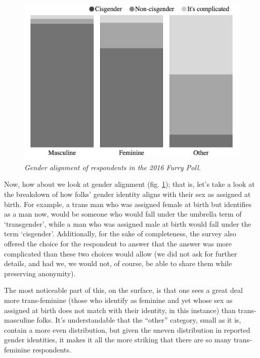 \begin{figure}
  \centering
  \includegraphics[scale=0.45]{assets/alignment.png}
  \caption{\textit{Gender alignment of respondents in the 2016 Furry Poll.}}
  \label{fig:alignment}
\end{figure}

Now, how about we look at gender alignment (fig. \ref{fig:alignment}); that is, let's take a look at the breakdown of how folks' gender identity aligns with their sex as assigned at birth.  For example, a trans man who was assigned female at birth but identifies as a man now, would be someone who would fall under the umbrella term of `transgender', while a man who was assigned male at birth would fall under the term `cisgender'.  Additionally, for the sake of completeness, the survey also offered the choice for the respondent to answer that the answer was more complicated than these two choices would allow (we did not ask for further details, and had we, we would not, of course, be able to share them while preserving anonymity).

The most noticeable part of this, on the surface, is that one sees a great deal more trans-feminine (those who identify as feminine and yet whose sex as assigned at birth does not match with their identity, in this instance) than trans-masculine folks.  It's understandable that the ``other'' category, small as it is, contain a more even distribution, but given the uneven distribution in reported gender identities, it makes it all the more striking that there are so many trans-feminine respondents.

